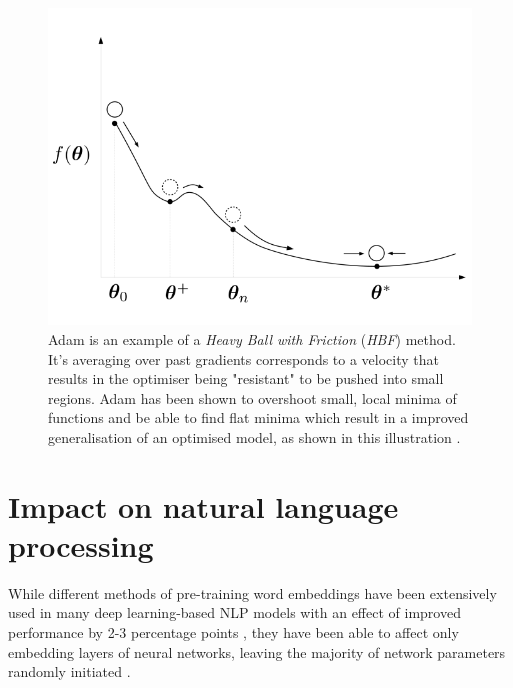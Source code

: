 \begin{figure}[]
\centering
\includegraphics[scale=0.30]{figures/hbf.png}
\caption{Adam is an example of a \emph{Heavy Ball with Friction} (\emph{HBF}) method. It's averaging over past gradients corresponds to a velocity that results in the optimiser being "resistant" to be pushed into small regions. Adam has been shown to overshoot small, local minima of functions and be able to find flat minima which result in a improved generalisation of an optimised model, as shown in this illustration \cite{gans:adam}.}
\label{adam}
\end{figure}

\section{Impact on natural language processing}
\label{impact:nlp}

While different methods of pre-training word embeddings have been extensively used in many deep learning-based NLP models with an effect of improved performance by 2-3 percentage points \cite{kim:cnnembeddings}, they have been able to affect only embedding layers of neural networks, leaving the majority of network parameters randomly initiated \cite{ulmfit}. 

